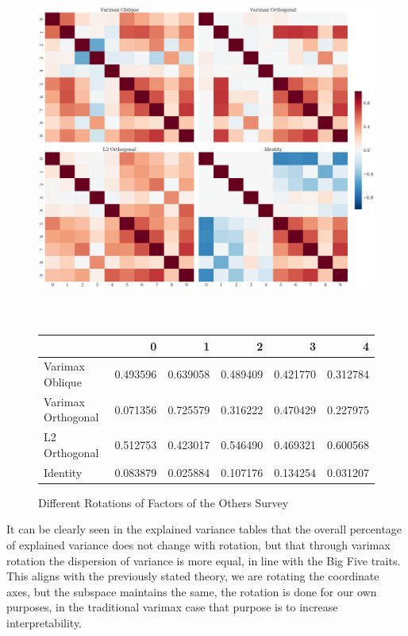 \documentclass[a4paper,12pt]{article}
\begin{document}
\begin{figure}
\includegraphics[width=\linewidth]{images/grid_others.png}
\\
\\
\\
\begin{tabular}{lrrrrr}
\toprule
{} &         0 &         1 &         2 &         3 &         4 \\
\midrule
Varimax Oblique    &  0.493596 &  0.639058 &  0.489409 &  0.421770 &  0.312784 \\
Varimax Orthogonal &  0.071356 &  0.725579 &  0.316222 &  0.470429 &  0.227975 \\
L2 Orthogonal      &  0.512753 &  0.423017 &  0.546490 &  0.469321 &  0.600568 \\
Identity           &  0.083879 &  0.025884 &  0.107176 &  0.134254 &  0.031207 \\
\bottomrule
\end{tabular}
\caption{Different Rotations of Factors of the Others Survey}\label{fig:grid-others}
\end{figure}


It can be clearly seen in the explained variance tables that the overall percentage of explained variance does not change with rotation, but that through varimax rotation the dispersion of variance is more equal, in line with the Big Five traits. This aligns with the previously stated theory, we are rotating the coordinate axes, but the subspace maintains the same, the rotation is done for our own purposes, in the traditional varimax case that purpose is to increase interpretability.
\end{document}
